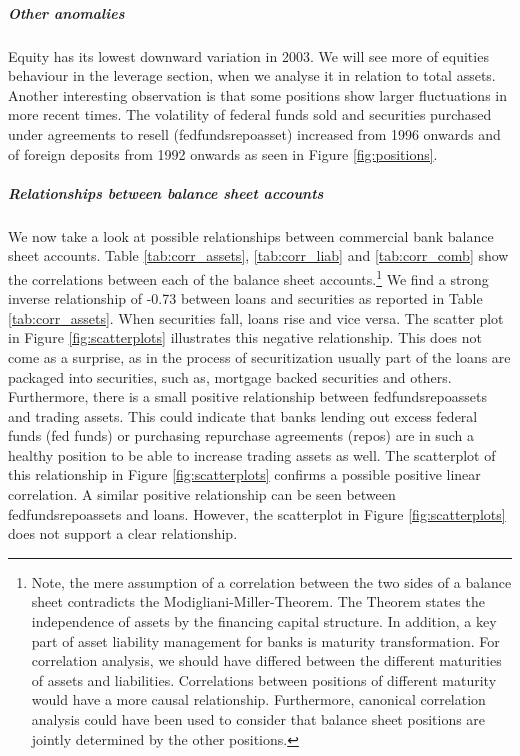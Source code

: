 \documentclass[12pt, a4paper]{article} %
\begin{document}
\subparagraph{Other anomalies}
Equity has its lowest downward variation in 2003. We will see more of equities behaviour in the leverage section, when we analyse it in relation to total assets.
Another interesting observation is that some positions show larger fluctuations in more recent times. The volatility of federal funds sold and securities purchased under agreements to resell (fedfundsrepoasset) increased from 1996 onwards and of foreign deposits from 1992 onwards as seen in Figure \ref{fig:positions}.


\subparagraph{Relationships between balance sheet accounts}
We now take a look at possible relationships between commercial bank balance sheet accounts.
Table \ref{tab:corr_assets}, \ref{tab:corr_liab} and \ref{tab:corr_comb} show the correlations between each of the balance sheet accounts.\footnote{Note, the mere assumption of a correlation between the two sides of a balance sheet contradicts the Modigliani-Miller-Theorem. The Theorem states the independence of assets by the financing capital structure. In addition, a key part of asset liability management for banks is maturity transformation. For correlation analysis, we should have differed between the different maturities of assets and liabilities. Correlations between positions of different maturity would have a more causal relationship. Furthermore, canonical correlation analysis could have been used to consider that balance sheet positions are jointly determined by the other positions.}
We find a strong inverse relationship of -0.73 between loans and securities as reported in Table \ref{tab:corr_assets}. When securities fall, loans rise and vice versa. The scatter plot in Figure \ref{fig:scatterplots} illustrates this negative relationship. This does not come as a surprise, as in the process of securitization usually part of the loans are packaged into securities, such as, mortgage backed securities and others.\\
Furthermore, there is a small positive relationship between fedfundsrepoassets and trading assets. This could indicate that banks lending out excess federal funds (fed funds) or purchasing repurchase agreements (repos) are in such a healthy position to be able to increase trading assets as well. The scatterplot of this relationship in Figure \ref{fig:scatterplots} confirms a possible positive linear correlation. A similar positive relationship can be seen between fedfundsrepoassets and loans. However, the scatterplot in Figure \ref{fig:scatterplots} does not support a clear relationship.\\
\end{document}
